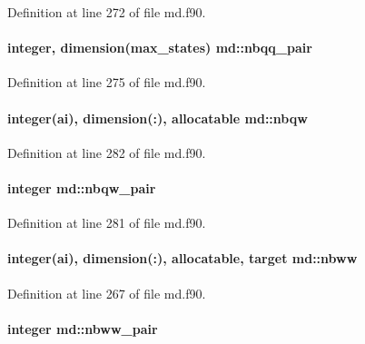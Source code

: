 Definition at line 272 of file md.\-f90.

\hypertarget{classmd_a41e24bb8f16beabed196a1537539bdd2}{
\paragraph[{nbqq\-\_\-pair}]{\setlength{\rightskip}{0pt plus 5cm}integer, dimension(max\-\_\-states) md\-::nbqq\-\_\-pair}}\label{classmd_a41e24bb8f16beabed196a1537539bdd2}


Definition at line 275 of file md.\-f90.

\hypertarget{classmd_a9ee60541bbec79e24a577be3905cc720}{
\paragraph[{nbqw}]{\setlength{\rightskip}{0pt plus 5cm}integer(ai), dimension(\-:), allocatable md\-::nbqw}}\label{classmd_a9ee60541bbec79e24a577be3905cc720}


Definition at line 282 of file md.\-f90.

\hypertarget{classmd_a02693a554947ac1e9b8b8e83e85f46b8}{
\paragraph[{nbqw\-\_\-pair}]{\setlength{\rightskip}{0pt plus 5cm}integer md\-::nbqw\-\_\-pair}}\label{classmd_a02693a554947ac1e9b8b8e83e85f46b8}


Definition at line 281 of file md.\-f90.

\hypertarget{classmd_a05eb466b8d0cbe3a12c21670722ade47}{
\paragraph[{nbww}]{\setlength{\rightskip}{0pt plus 5cm}integer(ai), dimension(\-:), allocatable, target md\-::nbww}}\label{classmd_a05eb466b8d0cbe3a12c21670722ade47}


Definition at line 267 of file md.\-f90.

\hypertarget{classmd_afc892dd0e6e7e751f24add805282c9f0}{
\paragraph[{nbww\-\_\-pair}]{\setlength{\rightskip}{0pt plus 5cm}integer md\-::nbww\-\_\-pair}}\label{classmd_afc892dd0e6e7e751f24add805282c9f0}


